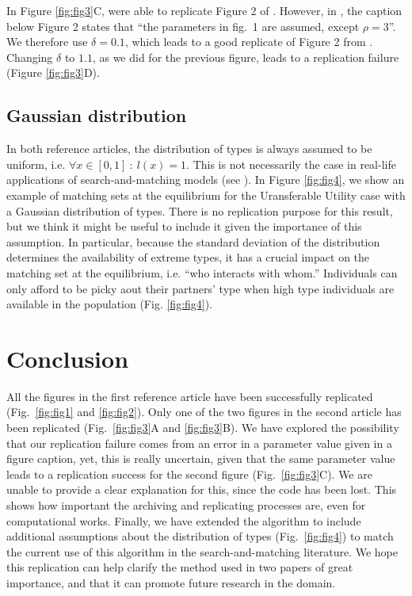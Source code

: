 In Figure \ref{fig:fig3}C, were able to replicate Figure 2 of \citep{smith_marriage_2006}. However, in \citep{smith_marriage_2006}, the caption below Figure 2 states that ``the parameters in fig.~1 are assumed, except $\rho=3$''. We therefore use $\delta=0.1$, which leads to a good replicate of Figure 2 from \citep{smith_marriage_2006}. Changing $\delta$ to $1.1$, as we did for the previous figure, leads to a replication failure (Figure \ref{fig:fig3}D).


\subsection*{Gaussian distribution}

In both reference articles, the distribution of types is always assumed to be uniform, i.e. $\forall x \in [0,1] \ : \ l(x)=1$. This is not necessarily the case in real-life applications of search-and-matching models (see \citep{hagedorn_identifying_2017}). In Figure \ref{fig:fig4}, we show an example of matching sets at the equilibrium for the Uransferable Utility case with a Gaussian distribution of types. There is no replication purpose for this result, but we think it might be useful to include it given the importance of this assumption. In particular, because the standard deviation of the distribution determines the availability of extreme types, it has a crucial impact on the matching set at the equilibrium, i.e. ``who interacts with whom.'' Individuals can only afford to be picky aout their partners' type when high type individuals are available in the population (Fig. \ref{fig:fig4}).





\section*{Conclusion}
All the figures in the first reference article \citep{shimer_assortative_2000} have been successfully replicated (Fig.~\ref{fig:fig1} and \ref{fig:fig2}). Only one of the two figures in the second article \citep{smith_marriage_2006} has been replicated (Fig.~\ref{fig:fig3}A and \ref{fig:fig3}B). We have explored the possibility that our replication failure comes from an error in a parameter value given in a figure caption, yet, this is really uncertain, given that the same parameter value leads to a replication success for the second figure (Fig.~\ref{fig:fig3}C). We are unable to provide a clear explanation for this, since the code has been lost. This shows how important the archiving and replicating processes are, even for computational works. Finally, we have extended the algorithm to include additional assumptions about the distribution of types (Fig.~\ref{fig:fig4}) to match the current use of this algorithm in the search-and-matching literature. We hope this replication can help clarify the method used in two papers of great importance, and that it can promote future research in the domain.





